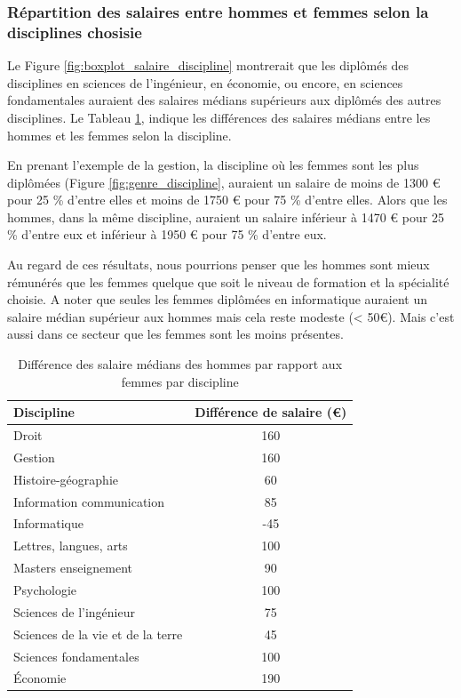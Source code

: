 \documentclass[12pt, a4paper, titlepage, table]{article}
\begin{document}
	\subsubsection{Répartition des salaires entre hommes et femmes selon la disciplines chosisie}

	Le Figure \ref{fig:boxplot_salaire_discipline} montrerait que les diplômés des disciplines en sciences de l'ingénieur, en économie, ou encore, en sciences fondamentales auraient des salaires médians supérieurs aux diplômés des autres disciplines. Le Tableau \ref{tab:diff_salaire_genre}, indique les différences des salaires médians entre les hommes et les femmes selon la discipline.
	
	En prenant l'exemple de la gestion, la discipline où les femmes sont les plus diplômées (Figure \ref{fig:genre_discipline}, auraient un salaire de moins de 1300 € pour 25 \% d'entre elles et moins de 1750 € pour 75 \% d'entre elles.
	Alors que les hommes, dans la même discipline, auraient un salaire inférieur à 1470 € pour  25 \% d'entre eux et inférieur à 1950 € pour 75 \% d'entre eux. 
	
	Au regard de ces résultats, nous pourrions penser que les hommes sont mieux rémunérés que les femmes quelque que soit le niveau de formation et la spécialité choisie. A noter que seules les femmes diplômées en informatique auraient un salaire médian supérieur aux hommes mais cela reste modeste (< 50€). Mais c'est aussi dans ce secteur que les femmes sont les moins présentes.
	
	\begin{table}[H]
		\centering
		\begin{tabular}{lc}
			\toprule
			\textbf{Discipline} & \textbf{Différence de salaire (€)} \\
			\midrule
			Droit & 160 \\
			Gestion & 160 \\
			Histoire-géographie & 60 \\
			Information communication & 85 \\
			Informatique & -45 \\
			Lettres, langues, arts & 100 \\
			Masters enseignement & 90 \\
			Psychologie & 100 \\
			Sciences de l'ingénieur & 75 \\
			Sciences de la vie et de la terre & 45 \\
			Sciences fondamentales & 100 \\
			Économie & 190 \\
			\bottomrule
		\end{tabular}
		\caption{Différence des salaire médians des hommes par rapport aux femmes par discipline}
		\label{tab:diff_salaire_genre}
	\end{table}
\end{document}
